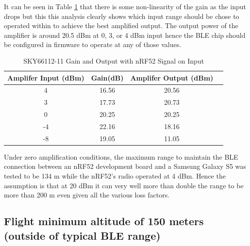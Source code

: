 \documentclass{workreport}
\begin{document}
\begin{body}
	It can be seen in Table \ref{tbl:amp_table} that there is some non-linearity of the gain as the input drops but this this analysis clearly shows which input range should be chose to operated within to achieve the best amplified output. The output power of the amplifier is around 20.5 dBm at 0, 3, or 4 dBm input hence the BLE chip should be configured in firmware to operate at any of those values.

\begin{table}

	\centering

	\begin{tabular}{|c|c|c|c|} \hline
		Amplifer Input (dBm) & Gain(dB) & Amplifer Output (dBm) \\ \hline
		4 & 16.56 & 20.56 \\ \hline
		3  & 17.73 & 20.73 \\ \hline
		0  & 20.25 & 20.25 \\ \hline
		-4  & 22.16 & 18.16 \\ \hline
		-8  & 19.05 & 11.05 \\ \hline
	\end{tabular}
	\caption{SKY66112-11 Gain and Output with nRF52 Signal on Input}

	\label{tbl:amp_table}

\end{table}

	Under zero amplification conditions, the maximum range to maintain the BLE connection between an nRF52 development board and a Samsung Galaxy S5 was tested to be 134 m while the nRF52's radio operated at 4 dBm. Hence the assumption is that at 20 dBm it can very well more than double the range to be more than 200 m even given all the various loss factors.

\subsection{Flight minimum altitude of 150 meters (outside of typical BLE range)}


\end{body}
\end{document}
